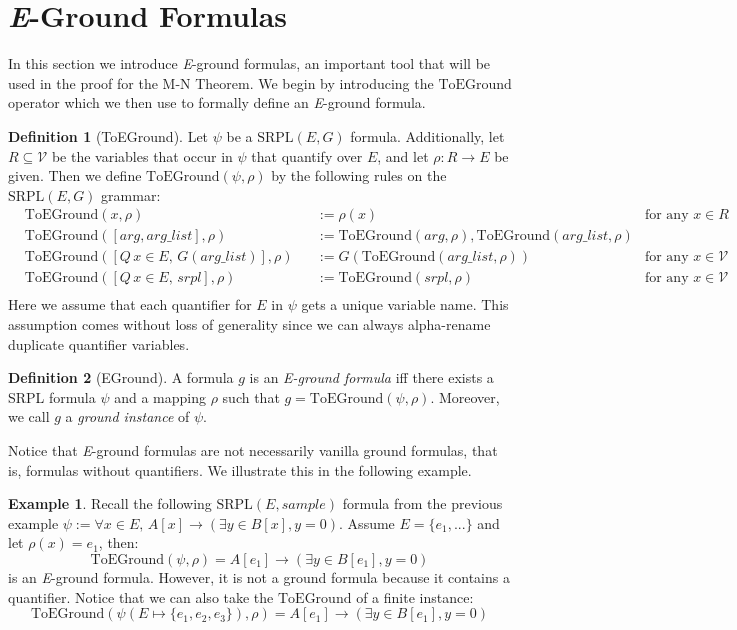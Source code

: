 \documentclass[12pt]{article}
\theoremstyle{definition}
\newtheorem{definition}{Definition}
\newtheorem{example}{Example}
\theoremstyle{remark}
\newcommand{\SRPL}{\text{SRPL}}
\newcommand{\toground}{\text{ToEGround}}
\begin{document}
\section{\textit{E}-Ground Formulas}

In this section we introduce \textit{E}-ground formulas, an important tool that will be used in the proof for the M-N Theorem.  We begin by introducing the $\toground$ operator which we then use to formally define an \textit{E}-ground formula.

\begin{definition}[ToEGround]
  Let $\psi$ be a $\SRPL(E,G)$ formula.  Additionally, let $R \subseteq \mathcal{V}$ be the variables that occur in $\psi$ that quantify over $E$, and let $\rho : R \to E$ be given.  Then we define $\toground(\psi,\rho)$ by the following rules on the $\SRPL(E,G)$ grammar:
  \begin{align*}
    &\toground(x,\rho)& &:= \rho(x) \qquad &\text{for any } x \in R\\
    &\toground([arg,arg\_list],\rho)& &:= \toground(arg,\rho),\toground(arg\_list,\rho)\\
    &\toground([Q \, x \in E, \, G(arg\_list)],\rho)& &:= G(\toground(arg\_list,\rho)) \qquad &\text{for any } x \in \mathcal{V}\\
    &\toground([Q \, x \in E, \, srpl],\rho)& &:= \toground(srpl,\rho)  \qquad &\text{for any } x \in \mathcal{V}\\
  \end{align*}
  Here we assume that each quantifier for $E$ in $\psi$ gets a unique variable name.  This assumption comes without loss of generality since we can always alpha-rename duplicate quantifier variables.
\end{definition}

\begin{definition}[EGround]
  A formula $g$ is an \textit{E-ground formula} iff there exists a SRPL formula $\psi$ and a mapping $\rho$ such that $g = \toground(\psi,\rho)$.  Moreover, we call $g$ a \textit{ground instance} of $\psi$.
\end{definition}

Notice that \textit{E}-ground formulas are not necessarily vanilla ground formulas, that is, formulas without quantifiers.  We illustrate this in the following example.

\begin{example}
  Recall the following $\SRPL(E,sample)$ formula from the previous example $\psi := \forall x \in E, \, A[x] \rightarrow (\exists y \in B[x], y = 0)$.  Assume $E = \{e_1,...\}$ and let $\rho(x) = e_1$, then:
  $$\toground(\psi,\rho) = A[e_1] \rightarrow (\exists y \in B[e_1], y = 0)$$
  is an \textit{E}-ground formula.  However, it is not a ground formula because it contains a quantifier.  Notice that we can also take the $\toground$ of a finite instance:
  $$\toground(\psi(E \mapsto \{e_1,e_2,e_3\}),\rho) = A[e_1] \rightarrow (\exists y \in B[e_1], y = 0)$$
\end{example}
\end{document}
